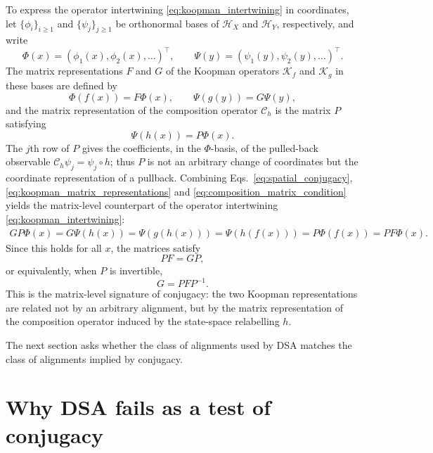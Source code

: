 \documentclass{article}
\theoremstyle{definition}
\begin{document}
To express the operator intertwining \eqref{eq:koopman_intertwining} in coordinates, let \(\{\phi_i\}_{i\geq 1}\) and \(\{\psi_j\}_{j\geq 1}\) be orthonormal bases of \(\mathcal H_X\) and \(\mathcal H_Y\), respectively, and write
\[
    \Phi(x)
    =
    (\phi_1(x),\phi_2(x),\ldots)^\top,
    \qquad
    \Psi(y)
    =
    (\psi_1(y),\psi_2(y),\ldots)^\top .
\]
The matrix representations $F$ and $G$ of the Koopman operators $\mathcal K_f$ and $\mathcal K_g$ in these bases are defined by
\begin{equation}
\label{eq:koopman_matrix_representations}
    \Phi(f(x)) = F\Phi(x),
    \qquad
    \Psi(g(y)) = G\Psi(y),
\end{equation}
and the matrix representation of the composition operator $\mathcal C_h$ is the matrix $P$ satisfying
\begin{equation}
\label{eq:composition_matrix_condition}
    \Psi(h(x)) = P\Phi(x).
\end{equation}
The $j$th row of $P$ gives the coefficients, in the $\Phi$-basis, of the pulled-back observable $\mathcal C_h \psi_j = \psi_j \circ h$; thus $P$ is not an arbitrary change of coordinates but the coordinate representation of a pullback. Combining Eqs.~\eqref{eq:spatial_conjugacy}, \eqref{eq:koopman_matrix_representations} and \eqref{eq:composition_matrix_condition} yields the matrix-level counterpart of the operator intertwining \eqref{eq:koopman_intertwining}:
\begin{align}
    G P \Phi(x)
    = G\Psi(h(x))
    = \Psi(g(h(x)))
    = \Psi(h(f(x)))
    = P\Phi(f(x))
    = P F\Phi(x).
\end{align}
Since this holds for all $x$, the matrices satisfy
\begin{equation}
\label{eq:matrix_intertwining}
    P F = G P,
\end{equation}
or equivalently, when $P$ is invertible,
\begin{equation}
\label{eq:matrix_similarity}
    G = P F P^{-1}.
\end{equation}
This is the matrix-level signature of conjugacy: the two Koopman representations are related not by an arbitrary alignment, but by the matrix representation of the composition operator induced by the state-space relabelling \(h\).

The next section asks whether the class of alignments used by DSA matches the class of alignments implied by conjugacy.





\section{Why DSA fails as a test of conjugacy}
\label{sec:diagnosis}
\end{document}
